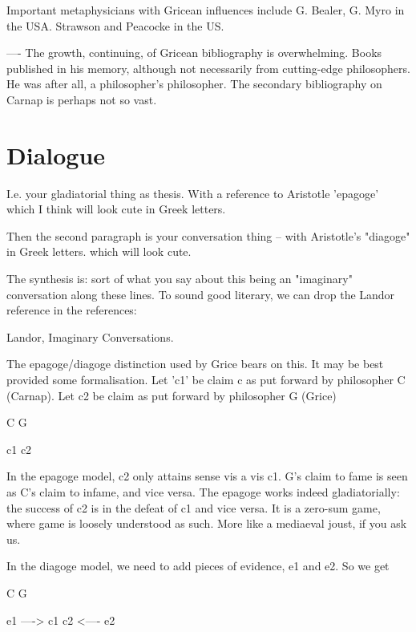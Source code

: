 \documentclass[10pt,titlepage]{book}
\begin{document}
Important metaphysicians with Gricean influences include G. Bealer, G. Myro 
 in the USA. Strawson and Peacocke in the US.
 
---- The growth, continuing, of Gricean bibliography is overwhelming. Books 
 published in his memory, although not necessarily from cutting-edge  
philosophers. He was after all, a philosopher's philosopher. The secondary  
bibliography on Carnap is perhaps not so vast.

\section{Dialogue}

I.e. your gladiatorial thing as thesis.
With a reference to Aristotle 'epagoge' which I think will look cute in Greek letters.
 
Then the second paragraph is your conversation thing -- with Aristotle's  
"diagoge" in Greek letters. which will look cute.
 
The synthesis is: sort of what you say about this being an "imaginary"  
conversation along these lines. To sound good literary, we can drop the Landor  
reference in the references:
 
   Landor, Imaginary Conversations.
 
 The epagoge/diagoge distinction used by Grice bears on this. It may be best 
 provided some formalisation. Let 'c1' be claim c as put forward by 
philosopher C  (Carnap). Let c2 be claim as put forward by philosopher G (Grice)
 
                  C                         G
 
                  c1                        c2
 
In the epagoge model, c2 only attains sense vis a vis c1. G's claim to fame 
 is seen as C's claim to infame, and vice versa. The epagoge works indeed  
gladiatorially: the success of c2 is in the defeat of c1 and vice versa. It 
is a  zero-sum game, where game is loosely understood as such. More like a 
mediaeval  joust, if you ask us.
 
In the diagoge model, we need to add pieces of evidence, e1 and e2. So we  
get
 
                   C                          G
 
  e1  ---->    c1                          c2  <---- e2
 
\end{document}
